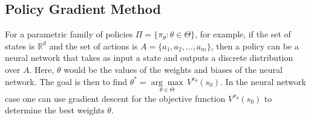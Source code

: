 \subsection{Policy Gradient Method}
For a parametric family of policies $\Pi = \{\pi_\theta:\theta\in\Theta\}$, for example, if the set of states is $\mathbb{R}^d$ and
the set of actions is $A = \{a_1, a_2, \ldots, a_m\}$, then a policy can be a neural network that takes as input a state and outputs a discrete distribution over $A$. Here, $\theta$ would be the values of the weights and biases of the neural network.
\newpar{}
The goal is then to find $\theta^* = \underset{\theta\in\Theta}{\arg\max}\,V^{\pi_\theta}(s_0)$.
\newpar{}
In the neural network case one can use gradient descent for the objective function $V^{\pi_\theta}(s_0)$ to determine the best weights $\theta$.
